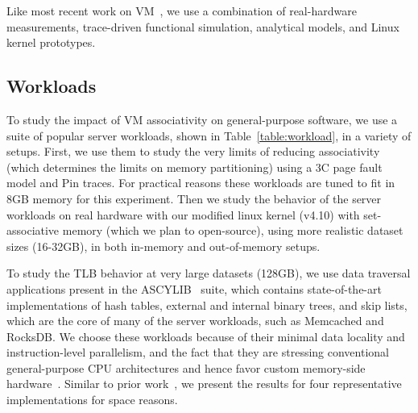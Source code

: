 Like most recent work on VM~\cite{basu:efficient, pham:increasing, pham:colt, bhattacharjee:large-reach, barr:spectlb, papadopoulou:prediction-based, saulsbury:recently-based}, we use a combination of real-hardware measurements, trace-driven functional simulation, analytical models, and Linux kernel prototypes.

\subsection{Workloads}
To study the impact of VM associativity on general-purpose software, we use a suite of popular server workloads, shown in Table~\ref{table:workload}, in a variety of setups. First, we use them to study the very limits of reducing associativity (which determines the limits on memory partitioning) using a 3C page fault model and Pin traces. For practical reasons these workloads are tuned to fit in 8GB memory for this experiment. Then we study the behavior of the server workloads on real hardware with our modified linux kernel (v4.10) with set-associative memory (which we plan to open-source), using more realistic dataset sizes (16-32GB), in both in-memory and out-of-memory setups.

To study the TLB behavior at very large datasets (128GB), we use  data traversal applications present in the ASCYLIB~\cite{david:asynchronized} suite, which contains state-of-the-art implementations of hash tables, external and internal binary trees, and skip lists, which are the core of many of the server workloads, such as Memcached and RocksDB. We choose these workloads because of their minimal data locality and instruction-level parallelism, and the fact that they are stressing conventional general-purpose CPU architectures and hence favor custom memory-side hardware~\cite{ haria:devirtualizing, picorel:near-memory, kocberber:meet, hsieh:accelerating}. Similar to prior work~\cite{picorel:near-memory}, we present the results for four representative implementations for space reasons. 



